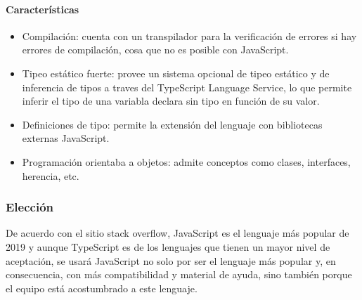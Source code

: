 \paragraph*{Características}
\begin{itemize}
    \item Compilación: cuenta con un transpilador para la verificación de errores si hay errores de compilación, cosa que no es posible con JavaScript.
    \item Tipeo estático fuerte: provee un sistema opcional de tipeo estático y de inferencia de tipos a traves del TypeScript Language Service, lo que permite inferir el tipo de una variabla declara sin tipo en función de su valor.
    \item Definiciones de tipo: permite la extensión del lenguaje con bibliotecas externas JavaScript.
    \item Programación orientaba a objetos: admite conceptos como clases, interfaces, herencia, etc.
\end{itemize}



\subsubsection*{Elección}

De acuerdo con el sitio stack overflow\cite{noauthor_stack_nodate}, JavaScript es el lenguaje más popular de 2019 y aunque TypeScript es de los lenguajes que tienen un mayor nivel de aceptación, se usará JavaScript no solo por ser el lenguaje más popular y, en consecuencia, con más compatibilidad y material de ayuda, sino también porque el equipo está acostumbrado a este lenguaje.

